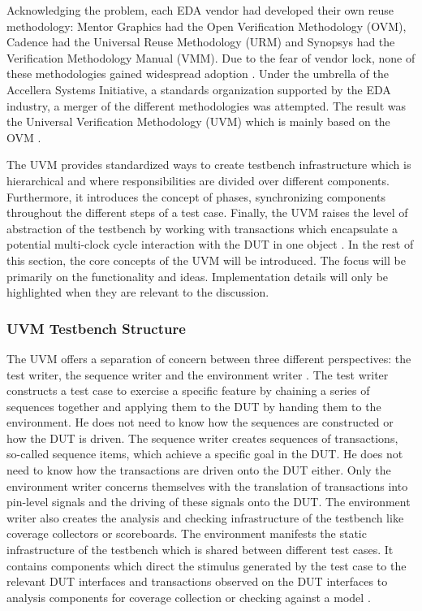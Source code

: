 \documentclass[11pt]{report}
\begin{document}
Acknowledging the problem, each EDA vendor had developed their own reuse methodology: Mentor Graphics had the Open
Verification Methodology (OVM), Cadence had the Universal Reuse Methodology (URM) and Synopsys had the Verification
Methodology Manual (VMM). Due to the fear of vendor lock, none of these methodologies gained widespread adoption
\cite[ch. 4.1]{mehta2018asic}. Under the umbrella of the Accellera Systems Initiative, a standards organization
supported by the EDA industry, a merger of the different methodologies was attempted. The result was the Universal
Verification Methodology (UVM) which is mainly based on the OVM \cite[ch. 4.1]{mehta2018asic}.

The UVM provides standardized ways to create testbench infrastructure which is hierarchical and where
responsibilities are divided over different components. Furthermore, it introduces the concept of phases,
synchronizing components throughout the different steps of a test case. Finally, the UVM raises the level of
abstraction of the testbench by working with transactions which encapsulate a potential multi-clock cycle interaction
with the DUT in one object \cite[ch. 4.1]{mehta2018asic}. In the rest of this section, the core concepts of the UVM
will be introduced. The focus will be primarily on the functionality and ideas. Implementation details will only be
highlighted when they are relevant to the discussion.

\subsubsection{UVM Testbench Structure} %

The UVM offers a separation of concern between three different perspectives: the test writer, the sequence writer and
the environment writer \cite{sutherland2015uvm}. The test writer constructs a test case to exercise a specific
feature by chaining a series of sequences together and applying them to the DUT by handing them to the environment.
He does not need to know how the sequences are constructed or how the DUT is driven. The sequence writer creates
sequences of transactions, so-called sequence items, which achieve a specific goal in the DUT. He does not need to
know how the transactions are
driven onto the DUT either. Only the environment writer concerns themselves with the translation of transactions into
pin-level signals and the driving of these signals onto the DUT. The environment writer also creates the analysis and
checking infrastructure of the testbench like coverage collectors or scoreboards. The environment manifests the
static infrastructure of the testbench which is shared between different test cases. It contains components which
direct the stimulus generated by the test case to the relevant DUT interfaces and transactions observed on the DUT
interfaces to analysis components for coverage
collection or checking against a model \cite{sutherland2015uvm}.
\end{document}
